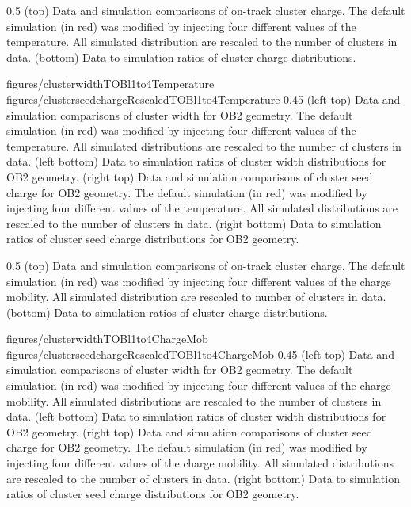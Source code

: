                  {0.5}       %
                 { (top) Data and simulation comparisons of on-track cluster charge. The default simulation (in red) was modified by injecting four different values of the temperature. All simulated distribution are rescaled to the number of clusters in data. (bottom) Data to simulation ratios of cluster charge distributions. }

                 {figures/clusterwidthTOBl1to4Temperature}
                 {figures/clusterseedchargeRescaledTOBl1to4Temperature} %
                 {0.45}       %
                 {(left top) Data and simulation  comparisons of cluster width for OB2 geometry. The default simulation (in red) was modified by injecting four different values of the temperature. All simulated distributions are rescaled to the number of clusters in data. (left bottom) Data to simulation ratios of cluster width distributions for OB2 geometry. (right top) Data and simulation  comparisons of cluster seed charge for OB2 geometry. The default simulation (in red) was modified by injecting four different values of the temperature. All simulated distributions are rescaled to the number of clusters in data. (right bottom) Data to simulation ratios of cluster seed charge distributions for OB2 geometry. }

                 {0.5}       %
                 { (top) Data and simulation comparisons of on-track cluster charge. The default simulation (in red) was modified by injecting four different values of the charge mobility. All simulated distribution are rescaled to number of clusters in data. (bottom) Data to simulation ratios of cluster charge distributions. }

                 {figures/clusterwidthTOBl1to4ChargeMob}
                 {figures/clusterseedchargeRescaledTOBl1to4ChargeMob} %
                 {0.45}       %
                 {(left top) Data and simulation  comparisons of cluster width for OB2 geometry. The default simulation (in red) was modified by injecting four different values of the charge mobility. All simulated distributions are rescaled to the number of clusters in data. (left bottom) Data to simulation ratios of cluster width distributions for OB2 geometry. (right top) Data and simulation  comparisons of cluster seed charge for OB2 geometry. The default simulation (in red) was modified by injecting four different values of the charge mobility. All simulated distributions are rescaled to the number of clusters in data. (right bottom) Data to simulation ratios of cluster seed charge distributions for OB2 geometry. }

